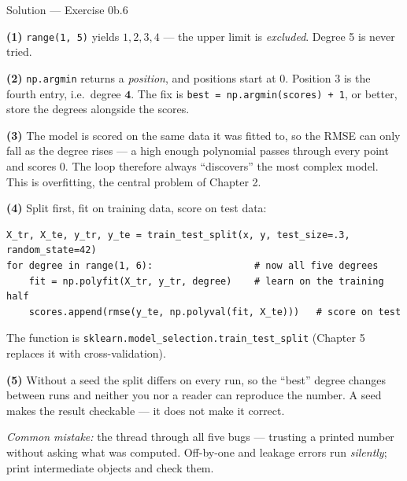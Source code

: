 \documentclass[aspectratio=169,11pt]{beamer}
\begin{document}
\begin{frame}[fragile]{Solution --- Exercise 0b.6}
  \begin{solutionbox}
    \scriptsize
    \textbf{(1)} \texttt{range(1, 5)} yields $1, 2, 3, 4$ --- the upper limit is
    \emph{excluded}. Degree 5 is never tried.

    \textbf{(2)} \texttt{np.argmin} returns a \emph{position}, and positions
    start at $0$. Position $3$ is the fourth entry, i.e.\ degree
    $\mathbf{4}$. The fix is \texttt{best = np.argmin(scores) + 1}, or better,
    store the degrees alongside the scores.

    \textbf{(3)} The model is scored on the same data it was fitted to, so the
    RMSE can only fall as the degree rises --- a high enough polynomial passes
    through every point and scores $0$. The loop therefore always ``discovers''
    the most complex model. This is overfitting, the central problem of
    Chapter 2.

    \textbf{(4)} Split first, fit on training data, score on test data:
\begin{lstlisting}
X_tr, X_te, y_tr, y_te = train_test_split(x, y, test_size=.3, random_state=42)
for degree in range(1, 6):                  # now all five degrees
    fit = np.polyfit(X_tr, y_tr, degree)    # learn on the training half
    scores.append(rmse(y_te, np.polyval(fit, X_te)))   # score on test
\end{lstlisting}
    The function is \texttt{sklearn.model\_selection.train\_test\_split}
    (Chapter 5 replaces it with cross-validation).

    \textbf{(5)} Without a seed the split differs on every run, so the ``best''
    degree changes between runs and neither you nor a reader can reproduce the
    number. A seed makes the result checkable --- it does not make it correct.

    \smallskip
    \textit{Common mistake:} the thread through all five bugs --- trusting a
    printed number without asking what was computed. Off-by-one and leakage
    errors run \emph{silently}; print intermediate objects and check them.
  \end{solutionbox}
\end{frame}
\end{document}
